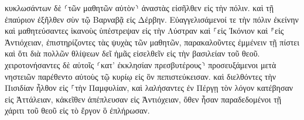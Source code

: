 \documentclass{openreader}
\begin{document}
κυκλωσάντων δὲ ⸂τῶν μαθητῶν αὐτὸν⸃ ἀναστὰς εἰσῆλθεν εἰς τὴν πόλιν. καὶ τῇ ἐπαύριον ἐξῆλθεν σὺν τῷ Βαρναβᾷ εἰς Δέρβην. 
Εὐαγγελισάμενοί τε τὴν πόλιν ἐκείνην καὶ μαθητεύσαντες ἱκανοὺς ὑπέστρεψαν εἰς τὴν Λύστραν καὶ ⸀εἰς Ἰκόνιον καὶ ⸁εἰς Ἀντιόχειαν, 
ἐπιστηρίζοντες τὰς ψυχὰς τῶν μαθητῶν, παρακαλοῦντες ἐμμένειν τῇ πίστει καὶ ὅτι διὰ πολλῶν θλίψεων δεῖ ἡμᾶς εἰσελθεῖν εἰς τὴν βασιλείαν τοῦ θεοῦ. 
χειροτονήσαντες δὲ αὐτοῖς ⸂κατ’ ἐκκλησίαν πρεσβυτέρους⸃ προσευξάμενοι μετὰ νηστειῶν παρέθεντο αὐτοὺς τῷ κυρίῳ εἰς ὃν πεπιστεύκεισαν. 
καὶ διελθόντες τὴν Πισιδίαν ἦλθον εἰς ⸀τὴν Παμφυλίαν, 
καὶ λαλήσαντες ἐν Πέργῃ τὸν λόγον κατέβησαν εἰς Ἀττάλειαν, 
κἀκεῖθεν ἀπέπλευσαν εἰς Ἀντιόχειαν, ὅθεν ἦσαν παραδεδομένοι τῇ χάριτι τοῦ θεοῦ εἰς τὸ ἔργον ὃ ἐπλήρωσαν. 
\end{document}
